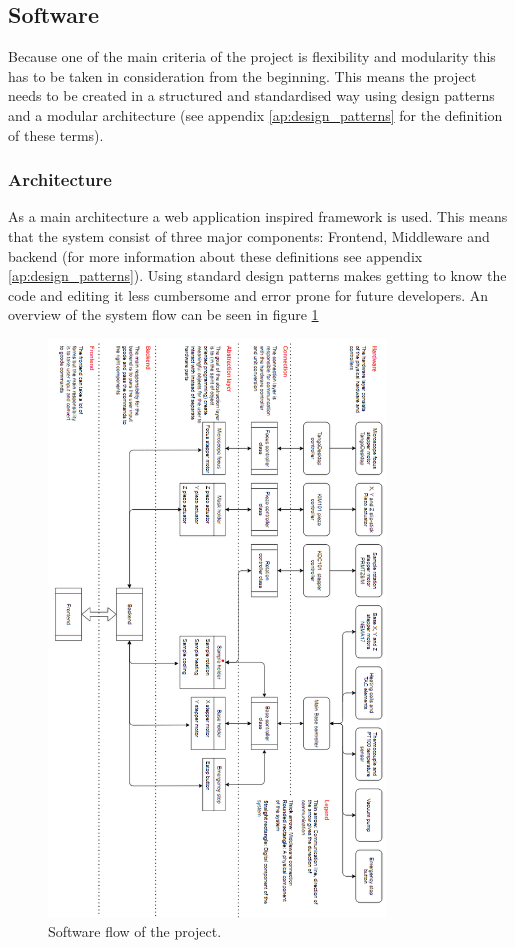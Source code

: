 \documentclass[11pt]{article}
\begin{document}
\subsection{Software}
Because one of the main criteria of the project is flexibility and modularity this has to be taken in consideration from the beginning. 
This means the project needs to be created in a structured and standardised way using design patterns and a modular architecture (see appendix \ref{ap:design_patterns} for the definition of these terms).

\subsubsection{Architecture}
As a main architecture a web application inspired framework is used. 
This means that the system consist of three major components: Frontend, Middleware and backend (for more information about these definitions see appendix \ref{ap:design_patterns}). 
Using standard design patterns makes getting to know the code and editing it less cumbersome and error prone for future developers.
An overview of the system flow can be seen in figure \ref{fig:software_architecture}

\begin{figure}[htp]
  \centering
  \includegraphics[width=0.8\textwidth]{img/code_flow.png}
  \caption{Software flow of the project.}
  \label{fig:software_architecture}
\end{figure}
\end{document}
